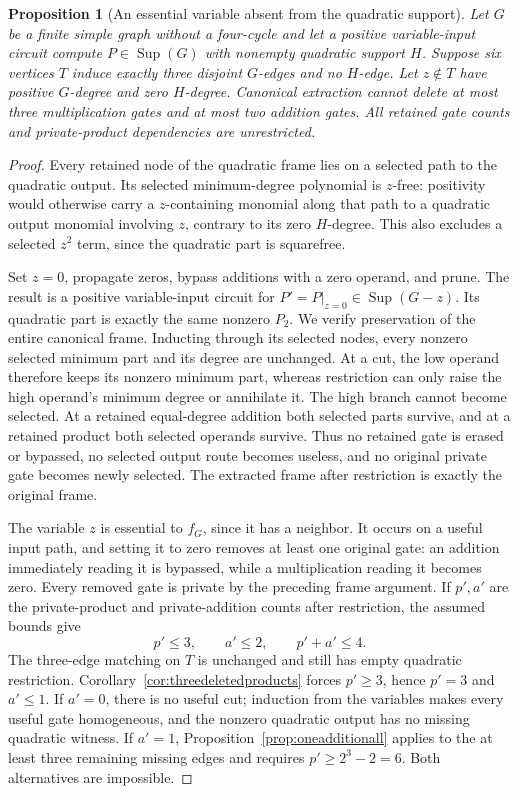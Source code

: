 \documentclass[11pt]{article}
\newcommand{\Sup}{\operatorname{Sup}}
\newtheorem{proposition}[theorem]{Proposition}
\theoremstyle{definition}
\theoremstyle{remark}
\begin{document}
\begin{proposition}[An essential variable absent from the quadratic support]\label{prop:absentvariable}
Let $G$ be a finite simple graph without a four-cycle and let a positive variable-input circuit compute $P\in\Sup(G)$ with nonempty quadratic support $H$. Suppose six vertices $T$ induce exactly three disjoint $G$-edges and no $H$-edge. Let $z\notin T$ have positive $G$-degree and zero $H$-degree. Canonical extraction cannot delete at most three multiplication gates and at most two addition gates. All retained gate counts and private-product dependencies are unrestricted.
\end{proposition}
\begin{proof}
Every retained node of the quadratic frame lies on a selected path to the quadratic output. Its selected minimum-degree polynomial is $z$-free: positivity would otherwise carry a $z$-containing monomial along that path to a quadratic output monomial involving $z$, contrary to its zero $H$-degree. This also excludes a selected $z^2$ term, since the quadratic part is squarefree.

Set $z=0$, propagate zeros, bypass additions with a zero operand, and prune. The result is a positive variable-input circuit for $P'=P|_{z=0}\in\Sup(G-z)$. Its quadratic part is exactly the same nonzero $P_2$. We verify preservation of the entire canonical frame. Inducting through its selected nodes, every nonzero selected minimum part and its degree are unchanged. At a cut, the low operand therefore keeps its nonzero minimum part, whereas restriction can only raise the high operand's minimum degree or annihilate it. The high branch cannot become selected. At a retained equal-degree addition both selected parts survive, and at a retained product both selected operands survive. Thus no retained gate is erased or bypassed, no selected output route becomes useless, and no original private gate becomes newly selected. The extracted frame after restriction is exactly the original frame.

The variable $z$ is essential to $f_G$, since it has a neighbor. It occurs on a useful input path, and setting it to zero removes at least one original gate: an addition immediately reading it is bypassed, while a multiplication reading it becomes zero. Every removed gate is private by the preceding frame argument. If $p',a'$ are the private-product and private-addition counts after restriction, the assumed bounds give
\[
 p'\le3,\qquad a'\le2,\qquad p'+a'\le4.
\]
The three-edge matching on $T$ is unchanged and still has empty quadratic restriction. Corollary~\ref{cor:threedeletedproducts} forces $p'\ge3$, hence $p'=3$ and $a'\le1$. If $a'=0$, there is no useful cut; induction from the variables makes every useful gate homogeneous, and the nonzero quadratic output has no missing quadratic witness. If $a'=1$, Proposition~\ref{prop:oneadditionall} applies to the at least three remaining missing edges and requires $p'\ge2^3-2=6$. Both alternatives are impossible.
\end{proof}
\end{document}
